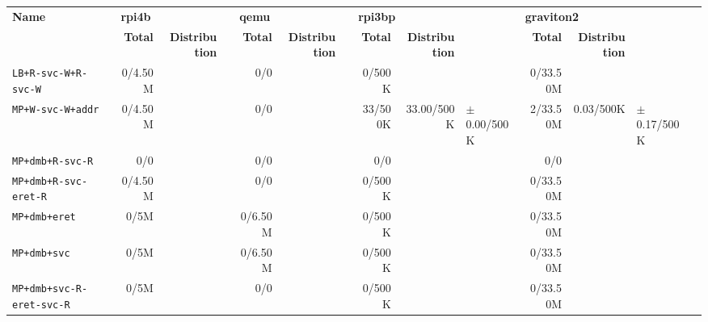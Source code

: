 \begin{tabular}{l  | r r l | r r l | r r l | r r l l}
   \textbf{Name}                  & \multicolumn{3}{l}{\textbf{rpi4b}}                       & \multicolumn{3}{l}{\textbf{qemu}}        & \multicolumn{3}{l}{\textbf{rpi3bp}}                       & \multicolumn{3}{l}{\textbf{graviton2}}                       & \\
                                  & \textbf{Total} & \textbf{Distribution} &                 & \textbf{Total} & \textbf{Distribution} &  & \textbf{Total} & \textbf{Distribution} &                 & \textbf{Total} & \textbf{Distribution} &                 & \\
        \verb|LB+R-svc-W+R-svc-W| &        0/4.50M &                       &                 &            0/0 &                       &  &         0/500K &                       &                 &       0/33.50M &                       &                 & \\ \hline 
           \verb|MP+W-svc-W+addr| &        0/4.50M &                       &                 &            0/0 &                       &  &        33/500K &            33.00/500K & $\pm$ 0.00/500K &       2/33.50M &             0.03/500K & $\pm$ 0.17/500K & \\ \hline 
            \verb|MP+dmb+R-svc-R| &            0/0 &                       &                 &            0/0 &                       &  &            0/0 &                       &                 &            0/0 &                       &                 & \\ \hline 
       \verb|MP+dmb+R-svc-eret-R| &        0/4.50M &                       &                 &            0/0 &                       &  &         0/500K &                       &                 &       0/33.50M &                       &                 & \\ \hline 
               \verb|MP+dmb+eret| &           0/5M &                       &                 &        0/6.50M &                       &  &         0/500K &                       &                 &       0/33.50M &                       &                 & \\ \hline 
                \verb|MP+dmb+svc| &           0/5M &                       &                 &        0/6.50M &                       &  &         0/500K &                       &                 &       0/33.50M &                       &                 & \\ \hline 
   \verb|MP+dmb+svc-R-eret-svc-R| &           0/5M &                       &                 &            0/0 &                       &  &         0/500K &                       &                 &       0/33.50M &                       &                 & \\ \hline 

\end{tabular}
